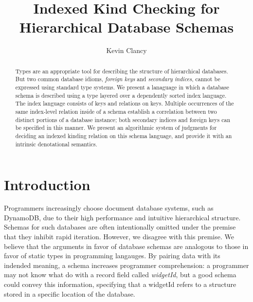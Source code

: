 \documentclass[sigplan,10pt,review,anonymous]{acmart}
\title{Indexed Kind Checking for Hierarchical Database Schemas}
\author{Kevin Clancy}
\begin{document}


\begin{abstract}

Types are an appropriate tool for describing the structure of hierarchical databases. But two common database idioms, \emph{foreign keys} and \emph{secondary indices}, cannot be expressed using standard type systems. We present a lanaguage in which a database schema is described using a type layered over a dependently sorted index language. The index language consists of keys and relations on keys. Multiple occurrences of the same index-level relation inside of a schema establish a correlation between two distinct portions of a database instance; both secondary indices and foreign keys can be specified in this manner. We present an algorithmic system of judgments for deciding an indexed kinding relation on this schema language, and provide it with an intrinsic denotational semantics.  



\end{abstract}

\maketitle

\section{Introduction}

Programmers increasingly choose document database systems, such as DynamoDB, due to their high performance and intuitive hierarchical structure. Schemas for such databases are often intentionally omitted under the premise that they inhibit rapid iteration. However, we disagree with this premise. We believe that the arguments in favor of database schemas are analogous to those in favor of static types in programming langauges. By pairing data with its indended meaning, a schema increases programmer comprehension: a programmer may not know what do with a record field called \emph{widgetId}, but a good schema could convey this information, specifying that a widgetId refers to a structure stored in a specific location of the database.
\end{document}
